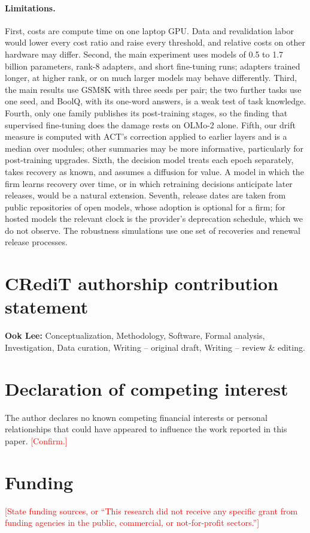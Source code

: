 \documentclass[preprint,12pt,authoryear]{elsarticle}
\newcommand{\todo}[1]{\textcolor{red}{[#1]}}
\begin{document}
\paragraph{Limitations.} First, costs are compute time on one laptop GPU. Data and revalidation labor would lower every cost ratio and raise every threshold, and relative costs on other hardware may differ. Second, the main experiment uses models of 0.5 to 1.7 billion parameters, rank-8 adapters, and short fine-tuning runs; adapters trained longer, at higher rank, or on much larger models may behave differently. Third, the main results use GSM8K with three seeds per pair; the two further tasks use one seed, and BoolQ, with its one-word answers, is a weak test of task knowledge. Fourth, only one family publishes its post-training stages, so the finding that supervised fine-tuning does the damage rests on OLMo-2 alone. Fifth, our drift measure is computed with ACT's correction applied to earlier layers and is a median over modules; other summaries may be more informative, particularly for post-training upgrades. Sixth, the decision model treats each epoch separately, takes recovery as known, and assumes a diffusion for value. A model in which the firm learns recovery over time, or in which retraining decisions anticipate later releases, would be a natural extension. Seventh, release dates are taken from public repositories of open models, whose adoption is optional for a firm; for hosted models the relevant clock is the provider's deprecation schedule, which we do not observe. The robustness simulations use one set of recoveries and renewal release processes.


\section*{CRediT authorship contribution statement}
\textbf{Ook Lee:} Conceptualization, Methodology, Software, Formal analysis, Investigation, Data curation, Writing -- original draft, Writing -- review \& editing.

\section*{Declaration of competing interest}
The author declares no known competing financial interests or personal relationships that could have appeared to influence the work reported in this paper. \todo{Confirm.}

\section*{Funding}
\todo{State funding sources, or ``This research did not receive any specific grant from funding agencies in the public, commercial, or not-for-profit sectors.''}
\end{document}
